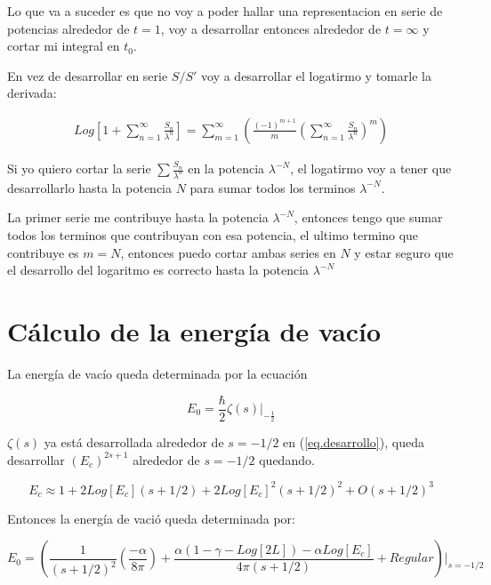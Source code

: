Lo que va a suceder es que no voy a poder hallar una representacion en serie de potencias alrededor de $t=1$, voy a desarrollar entonces alrededor de $t = \infty$ y cortar mi integral en $t _0$.


En vez de desarrollar en serie $S/S'$ voy a desarrollar el logatirmo y tomarle la derivada:

\begin{equation}
\begin{array}{c}

Log 
\left[
	1 + \sum _{n=1} ^{\infty}  \frac{S _n}{\lambda ^n}
	\right] =
	
\sum _{m = 1} ^{\infty} 
	\left(
	\frac{(-1) ^{m+1} }{m}
	\left(
		\sum _{n=1} ^{\infty} \frac{S _n}{\lambda ^n}
		\right) ^m 
	\right)
\end{array}	
\end{equation}

Si yo quiero cortar la serie $\sum \frac{S _n}{\lambda ^n}$ en la potencia $\lambda ^{-N}$, el logatirmo voy a tener que desarrollarlo hasta la potencia $N$ para sumar todos los terminos $\lambda ^{-N}$.

La primer serie me contribuye hasta la potencia $\lambda ^{-N}$, entonces tengo que sumar todos los terminos que contribuyan con esa potencia, el ultimo termino que contribuye es $m=N$, entonces puedo cortar ambas series en $N$ y estar seguro que el desarrollo del logaritmo es correcto hasta la potencia $\lambda ^{-N}$



\section{Cálculo de la energía de vacío}

La energía de vacío queda determinada por la ecuación 

\begin{equation}
    E _0 = \frac{\hbar}{2}  
    \zeta (s)  |  _{- \frac{1}{2}}
\end{equation}

$\zeta (s)$ ya está desarrollada alrededor de $s=-1/2$ en (\ref{eq.desarrollo}), queda desarrollar $(E_c) ^{2s+1} $ alrededor de $s=-1/2$ quedando.

\begin{equation}
    E _c \approx 
    1 + 2 Log[E_c] (s + 1/2) +
    2 Log[E_c] ^2 (s+1/2) ^2 + 
    O (s+1/2)^3
\end{equation}

Entonces la energía de vació queda determinada por:

\begin{equation}
    E _0 =
    \left(
    \frac{1}{(s+1/2)^2} 
    \left(
    \frac{- \alpha}{8 \pi}
    \right)+
    \frac{
    \alpha(1 -\gamma-Log[2L]) - 
    \alpha Log[E_c] 
    }{4 \pi (s+1/2)} 
     + Regular
    \right) | _{s=-1/2}
\end{equation}\\



 
